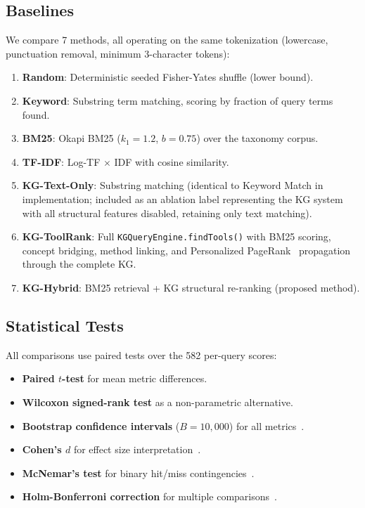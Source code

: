 \documentclass[11pt,a4paper]{article}
\begin{document}
\subsection{Baselines}

We compare 7 methods, all operating on the same tokenization (lowercase, punctuation removal, minimum 3-character tokens):

\begin{enumerate}
  \item \textbf{Random}: Deterministic seeded Fisher-Yates shuffle (lower bound).
  \item \textbf{Keyword}: Substring term matching, scoring by fraction of query terms found.
  \item \textbf{BM25}: Okapi BM25 ($k_1=1.2$, $b=0.75$) over the taxonomy corpus.
  \item \textbf{TF-IDF}: Log-TF $\times$ IDF with cosine similarity.
  \item \textbf{KG-Text-Only}: Substring matching (identical to Keyword Match in implementation; included as an ablation label representing the KG system with all structural features disabled, retaining only text matching).
  \item \textbf{KG-ToolRank}: Full \texttt{KGQueryEngine.findTools()} with BM25 scoring, concept bridging, method linking, and Personalized PageRank~\citep{page1999pagerank} propagation through the complete KG.
  \item \textbf{KG-Hybrid}: BM25 retrieval + KG structural re-ranking (proposed method).
\end{enumerate}

\subsection{Statistical Tests}

All comparisons use paired tests over the 582 per-query scores:
\begin{itemize}
  \item \textbf{Paired $t$-test} for mean metric differences.
  \item \textbf{Wilcoxon signed-rank test} as a non-parametric alternative.
  \item \textbf{Bootstrap confidence intervals} ($B=10{,}000$) for all metrics~\citep{efron1993bootstrap}.
  \item \textbf{Cohen's $d$} for effect size interpretation~\citep{cohen1988effect}.
  \item \textbf{McNemar's test} for binary hit/miss contingencies~\citep{mcnemar1947note}.
  \item \textbf{Holm-Bonferroni correction} for multiple comparisons~\citep{holm1979bonferroni}.
\end{itemize}
\end{document}
